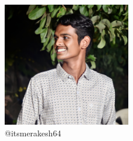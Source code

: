 \documentclass{article}
\begin{document}
			\begin{figure}
		\centering
		\includegraphics[width=0.5\textwidth]{1711864646001.jpg}
		\caption{\huge @itsmerakesh64}
		\label{fig : example}
		\end{figure}
	
\end{document}
